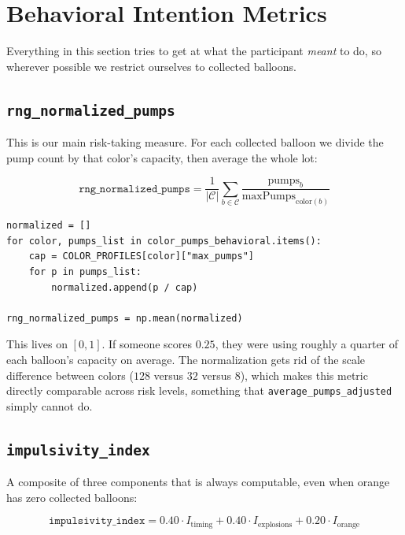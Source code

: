 \documentclass[11pt,a4paper]{article}
\begin{document}
\section{Behavioral Intention Metrics}

Everything in this section tries to get at what the participant \emph{meant}
to do, so wherever possible we restrict ourselves to collected balloons.

\subsection{\texttt{rng\_normalized\_pumps}}
\label{sec:rng_norm}

This is our main risk-taking measure. For each collected balloon we divide the
pump count by that color's capacity, then average the whole lot:

\begin{equation}
    \texttt{rng\_normalized\_pumps} = \frac{1}{|\mathcal{C}|}\sum_{b \in \mathcal{C}}
        \frac{\text{pumps}_b}{\text{maxPumps}_{\text{color}(b)}}
\end{equation}

\begin{lstlisting}[style=pythonstyle]
normalized = []
for color, pumps_list in color_pumps_behavioral.items():
    cap = COLOR_PROFILES[color]["max_pumps"]
    for p in pumps_list:
        normalized.append(p / cap)

rng_normalized_pumps = np.mean(normalized)
\end{lstlisting}

This lives on $[0, 1]$. If someone scores $0.25$, they were using roughly
a quarter of each balloon's capacity on average. The normalization gets rid of
the scale difference between colors ($128$ versus $32$ versus $8$), which makes
this metric directly comparable across risk levels, something that
\texttt{average\_pumps\_adjusted} simply cannot do.


\subsection{\texttt{impulsivity\_index}}
\label{sec:impulsivity}

A composite of three components that is always computable, even when orange
has zero collected balloons:

\begin{equation}
\boxed{
    \texttt{impulsivity\_index} = 0.40 \cdot I_{\text{timing}}
    + 0.40 \cdot I_{\text{explosions}}
    + 0.20 \cdot I_{\text{orange}}
}
\end{equation}
\end{document}
